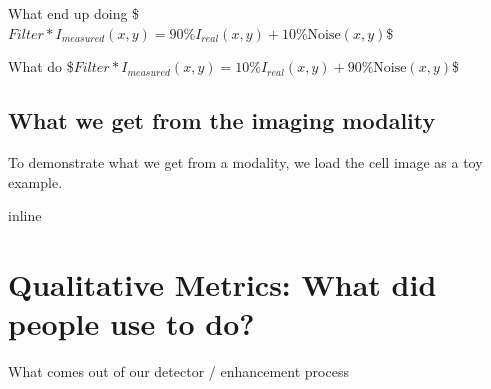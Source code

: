 \documentclass[letterpaper,10pt,english]{sphinxmanual}
\begin{document}
\sphinxAtStartPar
What  end up doing
\$\( \textit{Filter} \ast I_{measured}(x,y) = 90\%  I_{real}(x,y) + 10\% \text{Noise}(x,y) \)\$





\sphinxAtStartPar
What  do
\$\( \textit{Filter} \ast I_{measured}(x,y) = 10\% I_{real}(x,y) + 90\% \text{Noise}(x,y) \)\$




\section{What we get from the imaging modality}
\label{\detokenize{04-BasicSegmentation:what-we-get-from-the-imaging-modality}}
\sphinxAtStartPar
To demonstrate what we get from a modality, we load the cell image as a toy example.

\begin{sphinxVerbatim}[commandchars=\\\{\}]
 inline
   
   
   
\end{sphinxVerbatim}

\begin{sphinxVerbatim}[commandchars=\\\{\}]
  
   
\end{sphinxVerbatim}

\noindent{}


\chapter{Qualitative Metrics: What did people use to do?}
\label{\detokenize{04-BasicSegmentation:qualitative-metrics-what-did-people-use-to-do}}
\sphinxAtStartPar
What comes out of our detector / enhancement process
\end{document}
